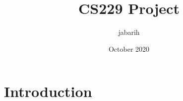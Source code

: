 \documentclass{article}
\title{CS229 Project}
\author{jabarih }
\date{October 2020}
\begin{document}
\maketitle

\section{Introduction}
\end{document}
